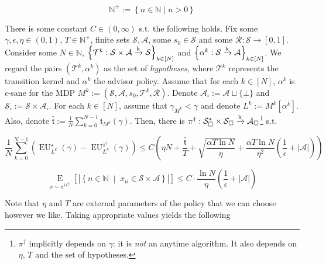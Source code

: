 \documentclass[anon,12pt]{colt2018} %
\newcommand{\AP}[1]{\left(#1\right)}
\newcommand{\AB}[1]{\left[#1\right]}
\newcommand{\AC}[1]{\left\{#1\right\}}
\newcommand{\ACM}[2]{\left\{#1\;\middle\vert\;#2\right\}}
\newcommand{\Ea}[2]{\underset{#1}{\operatorname{E}}\AB{#2}}
\newcommand{\Nats}{\mathbb{N}}
\newcommand{\Abs}[1]{\left\vert #1 \right\vert}
\newcommand{\K}{\xrightarrow{\textnormal{k}}}
\newcommand{\A}{\mathcal{A}}
\newcommand{\St}{\mathcal{S}}
\newcommand{\T}{\mathcal{T}}
\newcommand{\R}{\mathcal{R}}
\newcommand{\EU}{\operatorname{EU}}
\newcommand{\Tn}{\mathfrak{t}}
\newcommand{\Ad}{\alpha}
\begin{document}
\[\Nats^+:=\AC{n \in \Nats \mid n > 0}\]

\begin{samepage}
\begin{theorem}
\label{thm:regret_bound}

There is some constant $C \in (0,\infty)$ s.t. the following holds. Fix some $\gamma,\epsilon,\eta \in (0,1)$, $T\in\Nats^+$, finite sets $\St,\A$, some $s_0 \in \St$ and some $\R: \St \rightarrow [0,1]$. Consider some $N \in \Nats$, $\AC{\T^k: \St \times \A \K \St}_{k\in[N]}$ and $\AC{\Ad^k :\St \K \A}_{k\in[N]}$. We regard the pairs $(\T^k,\Ad^k)$ as the set of \emph{hypotheses}, where $\T^k$ represents the transition kernel and $\Ad^k$ the advisor policy. Assume that for each $k\in[N]$, $\Ad^k$ is $\epsilon$-sane for the MDP $M^k:=\AP{\St,\A,s_0,\T^k,\R}$. Denote $\A_\square:=\A\sqcup\{\bot\}$ and $\St_\square:=\St \times \A_\square$. For each $k \in [N]$, assume that $\gamma_{M^k} < \gamma$ and denote $L^k:=M^k\AB{\Ad^k}$. Also, denote $\bar{\Tn}:=\frac{1}{N}\sum_{k=0}^{N-1} \Tn_{M^k}(\gamma)$. Then, there is $\pi^\dagger: \St_\square^* \times \St_\square \K \A_\square$\footnote{$\pi^\dagger$ implicitly depends on $\gamma$: it is \emph{not} an anytime algorithm. It also depends on $\eta$, $T$ and the set of hypotheses.} s.t.

\begin{equation}
\frac{1}{N}\sum_{k=0}^{N-1}\AP{\EU_{L^k}^\star(\gamma) - \EU_{L^k}^{\pi^\dagger}(\gamma)} \leq C\AP{\eta N+\frac{\bar{\Tn}}{T}+\sqrt{\frac{\alpha T \ln{N}}{\eta}}+\frac{\alpha T \ln{N}}{\eta^2}\AP{\frac{1}{\epsilon}+\Abs{\A}}}
\end{equation}

\begin{equation}
\Ea{x\sim\pi^{\dagger L^k}}{\Abs{\ACM{n\in\Nats}{x_n\in\St\times\A}}} \leq C\cdot\frac{\ln{N}}{\eta}\AP{\frac{1}{\epsilon}+\Abs{\A}}
\end{equation}

\end{theorem}
\end{samepage}

Note that $\eta$ and $T$ are external parameters of the policy that we can choose however we like. Taking appropriate values yields the following
\end{document}
